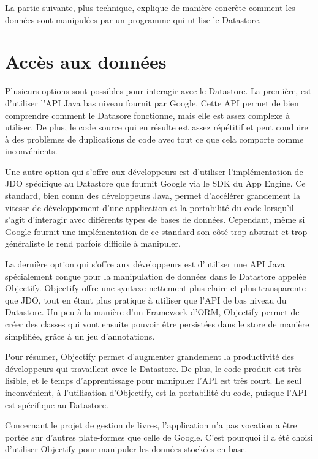 La partie suivante, plus technique, explique de manière concrète comment les données sont manipulées par un programme qui utilise le Datastore.

\section{Accès aux données}
Plusieurs options sont possibles pour interagir avec le Datastore. La première, est d’utiliser l’API Java bas niveau fournit par Google. Cette API permet de bien comprendre comment le Datasore fonctionne, mais elle est assez complexe à utiliser. De plus, le code source qui en résulte est assez répétitif et peut conduire à des problèmes de duplications de code avec tout ce que cela comporte comme inconvénients.

Une autre option qui s’offre aux développeurs est d’utiliser l’implémentation de JDO spécifique au Datastore que fournit Google via le SDK du App Engine. Ce standard, bien connu des développeurs Java, permet d’accélérer grandement la vitesse de développement d’une application et la portabilité du code lorsqu’il s’agit d’interagir avec différents types de bases de données. Cependant, même si Google fournit une implémentation de ce standard son côté trop abstrait et trop généraliste le rend parfois difficile à manipuler.

La dernière option qui s’offre aux développeurs est d’utiliser une API Java spécialement conçue pour la manipulation de données dans le Datastore appelée Objectify. Objectify offre une syntaxe nettement plus claire et plus transparente que JDO, tout en étant plus pratique à utiliser que l’API de bas niveau du Datastore. Un peu à la manière d’un Framework d’ORM, Objectify permet de créer des classes qui vont ensuite pouvoir être persistées dans le store de manière simplifiée, grâce à un jeu d’annotations. 

Pour résumer, Objectify permet d’augmenter grandement la productivité des développeurs qui travaillent avec le Datastore. De plus, le code produit est très lisible, et le temps d’apprentissage pour manipuler l’API est très court. Le seul inconvénient, à l’utilisation d’Objectify, est la portabilité du code, puisque l’API est spécifique au Datastore. 

Concernant le projet de gestion de livres, l’application n’a pas vocation a être portée sur d’autres plate-formes que celle de Google. C’est pourquoi il a été choisi d’utiliser Objectify pour manipuler les données stockées en base.

